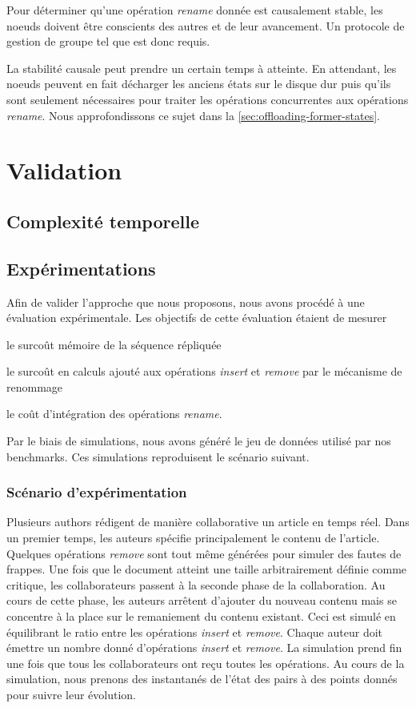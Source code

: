 \documentclass[12pt]{thesul}
\begin{document}
Pour déterminer qu'une opération \emph{rename} donnée est causalement stable, les noeuds doivent être conscients des autres et de leur avancement.
Un protocole de gestion de groupe tel que \cite{swim2002,lifeguard2018} est donc requis.

La stabilité causale peut prendre un certain temps à atteinte.
En attendant, les noeuds peuvent en fait décharger les anciens états sur le disque dur puis qu'ils sont seulement nécessaires pour traiter les opérations concurrentes aux opérations \emph{rename}.
Nous approfondissons ce sujet dans la \autoref{sec:offloading-former-states}.

\section{Validation}
\subsection{Complexité temporelle}
\subsection{Expérimentations}

Afin de valider l'approche que nous proposons, nous avons procédé à une évaluation expérimentale.
Les objectifs de cette évaluation étaient de mesurer
\begin{enumerate*}[label=(\roman*)]
  \item le surcoût mémoire de la séquence répliquée
  \item le surcoût en calculs ajouté aux opérations \emph{insert} et \emph{remove} par le mécanisme de renommage
  \item le coût d'intégration des opérations \emph{rename}.
\end{enumerate*}

Par le biais de simulations, nous avons généré le jeu de données utilisé par nos benchmarks.
Ces simulations reproduisent le scénario suivant.

\subsubsection{Scénario d'expérimentation}

Plusieurs authors rédigent de manière collaborative un article en temps réel.
Dans un premier temps, les auteurs spécifie principalement le contenu de l'article.
Quelques opérations \emph{remove} sont tout même générées pour simuler des fautes de frappes.
Une fois que le document atteint une taille arbitrairement définie comme critique, les collaborateurs passent à la seconde phase de la collaboration.
Au cours de cette phase, les auteurs arrêtent d'ajouter du nouveau contenu mais se concentre à la place sur le remaniement du contenu existant.
Ceci est simulé en équilibrant le ratio entre les opérations \emph{insert} et \emph{remove}.
Chaque auteur doit émettre un nombre donné d'opérations \emph{insert} et \emph{remove}.
La simulation prend fin une fois que tous les collaborateurs ont reçu toutes les opérations.
Au cours de la simulation, nous prenons des instantanés de l'état des pairs à des points donnés pour suivre leur évolution.
\end{document}

